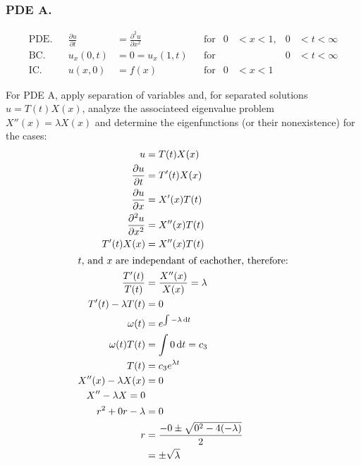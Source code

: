\documentclass{article}
\begin{document}
\subsubsection*{PDE A.}
\begin{align*}
  \text{PDE.}&&\frac{\partial u}{\partial t}&=\frac{\partial^2u}{\partial x^2}&&\text{for}&0&<x<1,&0&<t<\infty\\
  \text{BC.}&&u_x(0,t)&=0=u_x(1,t)&&\text{for}&&&0&<t<\infty\\
  \text{IC.}&&u(x,0)&=f(x)&&\text{for}&0&<x<1
\end{align*}

For PDE A, apply separation of variables and, for separated solutions $u=T(t)X(x)$, analyze the associateed eigenvalue problem $X''(x)=\lambda X(x)$ and determine the eigenfunctions (or their nonexistence) for the cases:
\begin{align*}
  u&=T(t)X(x)\\
  \frac{\partial u}{\partial t}&=T'(t)X(x)\\
  \frac{\partial u}{\partial x}&=X'(x)T(t)\\
  \frac{\partial^2 u}{\partial x^2}&=X''(x)T(t)\\
  T'(t)X(x)&=X''(x)T(t)\\
  \intertext{$t$, and $x$ are independant of eachother, therefore:}
  \frac{T'(t)}{T(t)}&=\frac{X''(x)}{X(x)}=\lambda\\
  T'(t)-\lambda T(t)&=0\\
  \omega(t)&=e^{\int{-\lambda\,\mathrm{d}t}}\\
  \omega(t)T(t)&=\int{0\,\mathrm{d}t}=c_3\\
  T(t)&=c_3e^{\lambda t}\\
  X''(x)-\lambda X(x)&=0\\
  X''-\lambda X=0\\
  r^2+0r-\lambda&=0\\
  r&=\frac{{-0}\pm\sqrt{0^2-4(-\lambda)}}{2}\\\
  &=\pm\sqrt{\lambda}
\end{align*}
\end{document}
